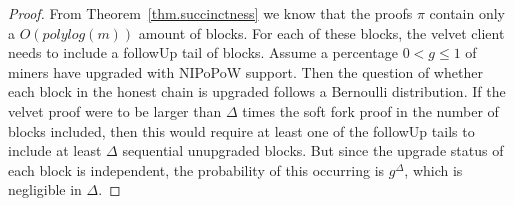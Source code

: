 \begin{proof}
    From Theorem~\ref{thm.succinctness} we know that the proofs $\pi$ contain
    only a $O(polylog(m))$ amount of blocks. For each of these blocks, the
    velvet client needs to include a followUp tail of blocks. Assume a
    percentage $0 < g \leq 1$ of miners have upgraded with NIPoPoW support.
    Then the question of whether each block in the honest chain is upgraded
    follows a Bernoulli distribution. If the velvet proof were to be larger
    than $\Delta$ times the soft fork proof in the number of blocks included,
    then this would require at least one of the followUp tails to include at
    least $\Delta$ sequential unupgraded blocks. But since the upgrade status
    of each block is independent, the probability of this occurring is
    $g^\Delta$, which is negligible in $\Delta$.
    \Qed
\end{proof}
